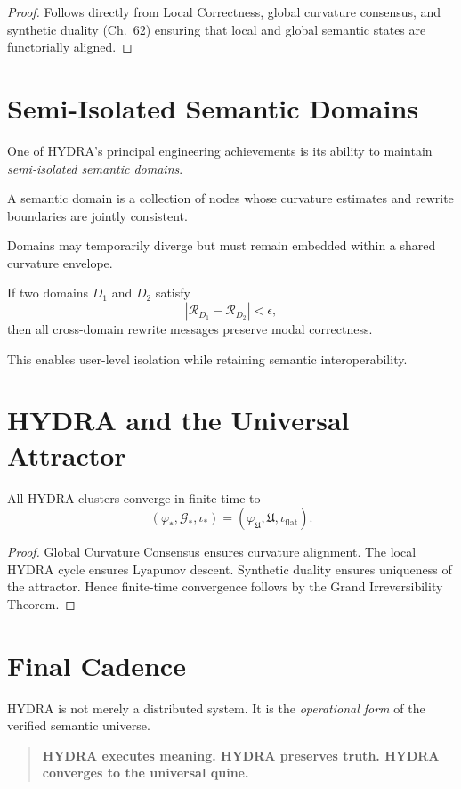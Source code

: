 \begin{proof}
Follows directly from Local Correctness, global curvature consensus, and 
synthetic duality (Ch.~62) ensuring that local and global semantic states are 
functorially aligned.
\end{proof}

\section{Semi-Isolated Semantic Domains}

One of HYDRA’s principal engineering achievements is its ability to maintain 
\emph{semi-isolated semantic domains}.

\begin{definition}
A semantic domain is a collection of nodes whose curvature estimates and 
rewrite boundaries are jointly consistent.
\end{definition}

Domains may temporarily diverge but must remain embedded within a shared 
curvature envelope.

\begin{theorem}
If two domains $D_1$ and $D_2$ satisfy
\[
|\mathcal{R}_{D_1} - \mathcal{R}_{D_2}| < \epsilon,
\]
then all cross-domain rewrite messages preserve modal correctness.
\end{theorem}

This enables user-level isolation while retaining semantic interoperability.

\section{HYDRA and the Universal Attractor}

\begin{theorem}
All HYDRA clusters converge in finite time to
\[
(\varphi_\ast, \mathcal{G}_\ast, \iota_\ast)
  = (\varphi_{\mathfrak{U}}, \mathfrak{U}, \iota_{\mathrm{flat}}).
\]
\end{theorem}

\begin{proof}
Global Curvature Consensus ensures curvature alignment.  
The local HYDRA cycle ensures Lyapunov descent.  
Synthetic duality ensures uniqueness of the attractor.  
Hence finite-time convergence follows by the Grand Irreversibility Theorem.
\end{proof}

\section{Final Cadence}

HYDRA is not merely a distributed system.  
It is the \emph{operational form} of the verified semantic universe.

\bigskip

\begin{quote}
\textbf{
HYDRA executes meaning.  
HYDRA preserves truth.  
HYDRA converges to the universal quine.  
}
\end{quote}

